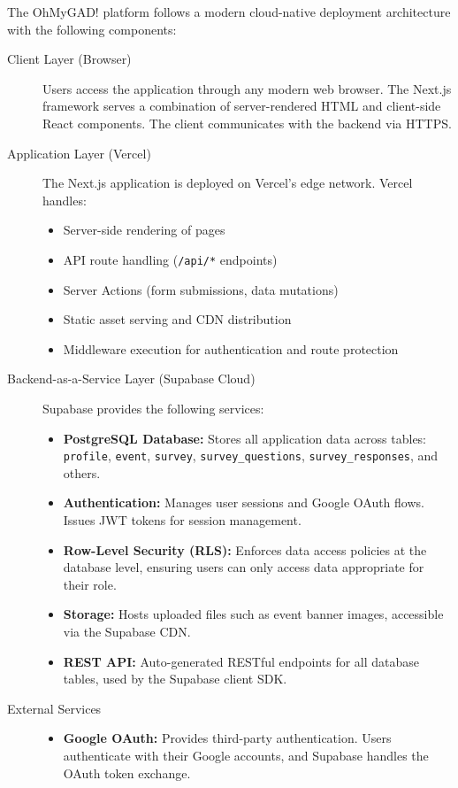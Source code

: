 \documentclass[11pt,a4paper]{article}
\begin{document}
The OhMyGAD! platform follows a modern cloud-native deployment architecture with the following components:

\begin{description}
  \item[Client Layer (Browser)]
    Users access the application through any modern web browser. The Next.js framework serves a combination of server-rendered HTML and client-side React components. The client communicates with the backend via HTTPS.

  \item[Application Layer (Vercel)]
    The Next.js application is deployed on Vercel's edge network. Vercel handles:
    \begin{itemize}[leftmargin=1.5em]
      \item Server-side rendering of pages
      \item API route handling (\texttt{/api/*} endpoints)
      \item Server Actions (form submissions, data mutations)
      \item Static asset serving and CDN distribution
      \item Middleware execution for authentication and route protection
    \end{itemize}

  \item[Backend-as-a-Service Layer (Supabase Cloud)]
    Supabase provides the following services:
    \begin{itemize}[leftmargin=1.5em]
      \item \textbf{PostgreSQL Database:} Stores all application data across tables: \texttt{profile}, \texttt{event}, \texttt{survey}, \texttt{survey\_questions}, \texttt{survey\_responses}, and others.
      \item \textbf{Authentication:} Manages user sessions and Google OAuth flows. Issues JWT tokens for session management.
      \item \textbf{Row-Level Security (RLS):} Enforces data access policies at the database level, ensuring users can only access data appropriate for their role.
      \item \textbf{Storage:} Hosts uploaded files such as event banner images, accessible via the Supabase CDN.
      \item \textbf{REST API:} Auto-generated RESTful endpoints for all database tables, used by the Supabase client SDK.
    \end{itemize}

  \item[External Services]
    \begin{itemize}[leftmargin=1.5em]
      \item \textbf{Google OAuth:} Provides third-party authentication. Users authenticate with their Google accounts, and Supabase handles the OAuth token exchange.
    \end{itemize}
\end{description}
\end{document}
